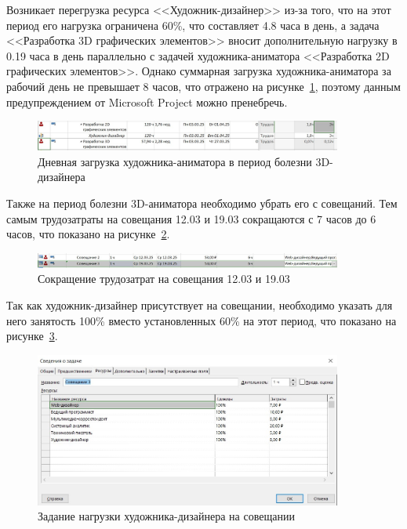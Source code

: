 Возникает перегрузка ресурса <<Художник-дизайнер>> из-за того, что на этот период его нагрузка ограничена 60\%, что составляет 4.8 часа в день, а задача <<Разработка 3D графических элементов>> вносит дополнительную нагрузку в 0.19 часа в день параллельно с задачей художника-аниматора <<Разработка 2D графических элементов>>.
Однако суммарная загрузка художника-аниматора за рабочий день не превышает 8 часов, что отражено на рисунке~\ref{fig:4_screen6}, поэтому данным предупреждением от Microsoft Project можно пренебречь.

\begin{figure}[H]
	\centering
	\includegraphics[width=0.9\textwidth]{img/lab4/screen6.jpg}
	\caption{Дневная загрузка художника-аниматора в период болезни 3D-дизайнера}
	\label{fig:4_screen6}
\end{figure}

Также на период болезни 3D-аниматора необходимо убрать его с совещаний.
Тем самым трудозатраты на совещания 12.03 и 19.03 сокращаются с 7 часов до 6 часов, что показано на рисунке~\ref{fig:4_screen7}.

\begin{figure}[H]
	\centering
	\includegraphics[width=0.9\textwidth]{img/lab4/screen7.jpg}
	\caption{Сокращение трудозатрат на совещания 12.03 и 19.03}
	\label{fig:4_screen7}
\end{figure}

Так как художник-дизайнер присутствует на совещании, необходимо указать для него занятость 100\% вместо установленных 60\% на этот период, что показано на рисунке~\ref{fig:4_screen8}.

\begin{figure}[H]
	\centering
	\includegraphics[width=0.9\textwidth]{img/lab4/screen8.jpg}
	\caption{Задание нагрузки художника-дизайнера на совещании}
	\label{fig:4_screen8}
\end{figure}

